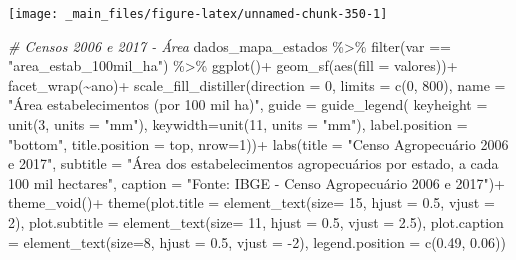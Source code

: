 \documentclass[
  brazilian,
]{book}
\newenvironment{Shaded}{\begin{snugshade}}{\end{snugshade}}
\newcommand{\AttributeTok}[1]{\textcolor[rgb]{0.77,0.63,0.00}{#1}}
\newcommand{\CommentTok}[1]{\textcolor[rgb]{0.56,0.35,0.01}{\textit{#1}}}
\newcommand{\DecValTok}[1]{\textcolor[rgb]{0.00,0.00,0.81}{#1}}
\newcommand{\FloatTok}[1]{\textcolor[rgb]{0.00,0.00,0.81}{#1}}
\newcommand{\FunctionTok}[1]{\textcolor[rgb]{0.00,0.00,0.00}{#1}}
\newcommand{\NormalTok}[1]{#1}
\newcommand{\SpecialCharTok}[1]{\textcolor[rgb]{0.00,0.00,0.00}{#1}}
\newcommand{\StringTok}[1]{\textcolor[rgb]{0.31,0.60,0.02}{#1}}
\begin{document}
\begin{center}\texttt{[image: \_main\_files/figure-latex/unnamed-chunk-350-1]} \end{center}

\begin{Shaded}
\begin{Highlighting}[]
\CommentTok{\# Censos 2006 e 2017 {-} Área}
\NormalTok{dados\_mapa\_estados }\SpecialCharTok{\%\textgreater{}\%} 
  \FunctionTok{filter}\NormalTok{(var }\SpecialCharTok{==} \StringTok{"area\_estab\_100mil\_ha"}\NormalTok{) }\SpecialCharTok{\%\textgreater{}\%}
  \FunctionTok{ggplot}\NormalTok{()}\SpecialCharTok{+}
  \FunctionTok{geom\_sf}\NormalTok{(}\FunctionTok{aes}\NormalTok{(}\AttributeTok{fill =}\NormalTok{ valores))}\SpecialCharTok{+}
  \FunctionTok{facet\_wrap}\NormalTok{(}\SpecialCharTok{\textasciitilde{}}\NormalTok{ano)}\SpecialCharTok{+}
  \FunctionTok{scale\_fill\_distiller}\NormalTok{(}\AttributeTok{direction =} \DecValTok{0}\NormalTok{,}
                       \AttributeTok{limits =} \FunctionTok{c}\NormalTok{(}\DecValTok{0}\NormalTok{, }\DecValTok{800}\NormalTok{),}
                       \AttributeTok{name =} \StringTok{"Área estabelecimentos (por 100 mil ha)"}\NormalTok{,}
                       \AttributeTok{guide =} \FunctionTok{guide\_legend}\NormalTok{(}
                         \AttributeTok{keyheight =} \FunctionTok{unit}\NormalTok{(}\DecValTok{3}\NormalTok{, }\AttributeTok{units =} \StringTok{"mm"}\NormalTok{),}
                         \AttributeTok{keywidth=}\FunctionTok{unit}\NormalTok{(}\DecValTok{11}\NormalTok{, }\AttributeTok{units =} \StringTok{"mm"}\NormalTok{),}
                         \AttributeTok{label.position =} \StringTok{"bottom"}\NormalTok{,}
                         \AttributeTok{title.position =} \StringTok{\textquotesingle{}top\textquotesingle{}}\NormalTok{, }\AttributeTok{nrow=}\DecValTok{1}\NormalTok{))}\SpecialCharTok{+}
  \FunctionTok{labs}\NormalTok{(}\AttributeTok{title =} \StringTok{"Censo Agropecuário 2006 e 2017"}\NormalTok{,}
       \AttributeTok{subtitle =} \StringTok{"Área dos estabelecimentos agropecuários por estado, a cada 100 mil hectares"}\NormalTok{,}
       \AttributeTok{caption =} \StringTok{"Fonte: IBGE {-} Censo Agropecuário 2006 e 2017"}\NormalTok{)}\SpecialCharTok{+}
  \FunctionTok{theme\_void}\NormalTok{()}\SpecialCharTok{+}
  \FunctionTok{theme}\NormalTok{(}\AttributeTok{plot.title =} \FunctionTok{element\_text}\NormalTok{(}\AttributeTok{size=} \DecValTok{15}\NormalTok{, }\AttributeTok{hjust =} \FloatTok{0.5}\NormalTok{, }\AttributeTok{vjust =} \DecValTok{2}\NormalTok{),}
        \AttributeTok{plot.subtitle =} \FunctionTok{element\_text}\NormalTok{(}\AttributeTok{size=} \DecValTok{11}\NormalTok{, }\AttributeTok{hjust =} \FloatTok{0.5}\NormalTok{, }\AttributeTok{vjust =} \FloatTok{2.5}\NormalTok{),}
        \AttributeTok{plot.caption =} \FunctionTok{element\_text}\NormalTok{(}\AttributeTok{size=}\DecValTok{8}\NormalTok{, }\AttributeTok{hjust =} \FloatTok{0.5}\NormalTok{, }\AttributeTok{vjust =} \SpecialCharTok{{-}}\DecValTok{2}\NormalTok{),}
        \AttributeTok{legend.position =} \FunctionTok{c}\NormalTok{(}\FloatTok{0.49}\NormalTok{, }\FloatTok{0.06}\NormalTok{))}
\end{Highlighting}
\end{Shaded}
\end{document}

